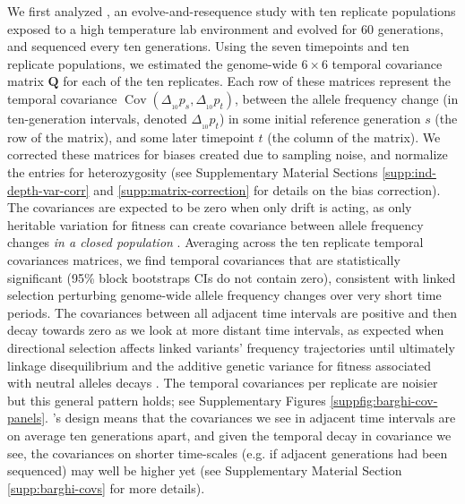 \documentclass[11pt]{article}
\newcommand{\gc}[1]{{\it \color{red} #1 } }
\DeclareMathOperator{\cov}{Cov}
\begin{document}
We first analyzed \textcite{Barghi2019-qy}, an evolve-and-resequence study with
ten replicate populations exposed to a high temperature lab environment and
evolved for 60 generations, and sequenced every ten generations. Using the
seven timepoints and ten replicate populations, we estimated the genome-wide $6
\times 6$ temporal covariance matrix $\mathbf{Q}$ for each of the ten
replicates. Each row of these matrices represent the temporal covariance
$\cov(\Delta_{_{10}} p_s, \Delta_{_{10}} p_t)$, between the allele frequency
change (in ten-generation intervals, denoted $\Delta_{_{10}} p_t$) in some
initial reference generation $s$ (the row of the matrix), and some later
timepoint $t$ (the column of the matrix). We corrected these matrices for
biases created due to sampling noise, and normalize the entries for
heterozygosity (see Supplementary Material Sections
\ref{supp:ind-depth-var-corr} and \ref{supp:matrix-correction} for details on
the bias correction). The covariances are expected to be zero when only drift
is acting, as only heritable variation for fitness can
create covariance between allele frequency changes \gc{in a closed population} \parencite{Buffalo2019-io}.
Averaging across the ten replicate temporal covariances matrices, we find
temporal covariances that are statistically significant (95\% block bootstraps
CIs do not contain zero), consistent with linked selection perturbing
genome-wide allele frequency changes over very short time periods. The
covariances between all adjacent time intervals are positive and then decay
towards zero as we look at more distant time intervals, as expected when
directional selection affects linked variants' frequency trajectories until
ultimately linkage disequilibrium and the additive genetic variance for fitness
associated with neutral alleles decays \parencite{Buffalo2019-io}. The temporal
covariances per replicate are noisier but this general pattern holds; see
Supplementary Figures \ref{suppfig:barghi-cov-panels}.
\textcite{Barghi2019-qy}'s design means that the covariances we see in adjacent
time intervals are on average ten generations apart, and given the temporal
decay in covariance we see, the covariances on shorter time-scales (e.g. if
adjacent generations had been sequenced) may well be higher yet (see
Supplementary Material Section \ref{supp:barghi-covs} for more details).
\end{document}

